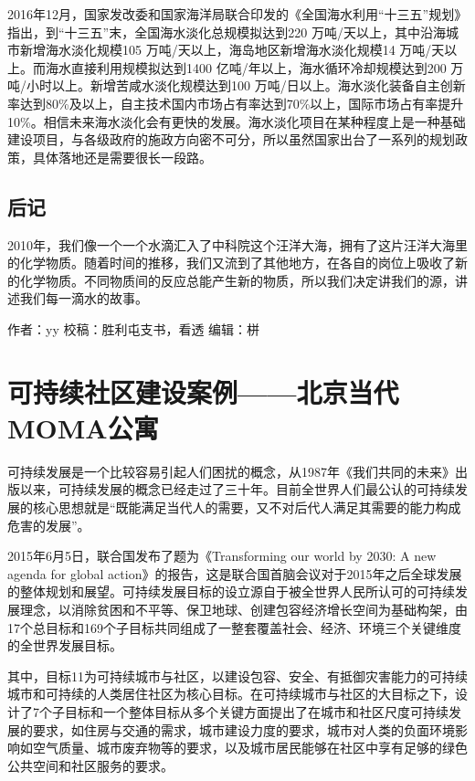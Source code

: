 \documentclass[]{book}
\begin{document}
2016年12月，国家发改委和国家海洋局联合印发的《全国海水利用``十三五''规划》指出，到``十三五''末，全国海水淡化总规模拟达到220
万吨/天以上，其中沿海城市新增海水淡化规模105
万吨/天以上，海岛地区新增海水淡化规模14
万吨/天以上。而海水直接利用规模拟达到1400
亿吨/年以上，海水循环冷却规模达到200
万吨/小时以上。新增苦咸水淡化规模达到100
万吨/日以上。海水淡化装备自主创新率达到80\%及以上，自主技术国内市场占有率达到70\%以上，国际市场占有率提升10\%。相信未来海水淡化会有更快的发展。海水淡化项目在某种程度上是一种基础建设项目，与各级政府的施政方向密不可分，所以虽然国家出台了一系列的规划政策，具体落地还是需要很长一段路。

\subsection{后记}

2010年，我们像一个一个水滴汇入了中科院这个汪洋大海，拥有了这片汪洋大海里的化学物质。随着时间的推移，我们又流到了其他地方，在各自的岗位上吸收了新的化学物质。不同物质间的反应总能产生新的物质，所以我们决定讲我们的源，讲述我们每一滴水的故事。

作者：yy 校稿：胜利屯支书，看透 编辑：栟

\section{可持续社区建设案例------北京当代MOMA公寓}\label{moma}

可持续发展是一个比较容易引起人们困扰的概念，从1987年《我们共同的未来》出版以来，可持续发展的概念已经走过了三十年。目前全世界人们最公认的可持续发展的核心思想就是``既能满足当代人的需要，又不对后代人满足其需要的能力构成危害的发展''。

2015年6月5日，联合国发布了题为《Transforming our world by 2030: A new
agenda for global
action》的报告，这是联合国首脑会议对于2015年之后全球发展的整体规划和展望。可持续发展目标的设立源自于被全世界人民所认可的可持续发展理念，以消除贫困和不平等、保卫地球、创建包容经济增长空间为基础构架，由17个总目标和169个子目标共同组成了一整套覆盖社会、经济、环境三个关键维度的全世界发展目标。

其中，目标11为可持续城市与社区，以建设包容、安全、有抵御灾害能力的可持续城市和可持续的人类居住社区为核心目标。在可持续城市与社区的大目标之下，设计了7个子目标和一个整体目标从多个关键方面提出了在城市和社区尺度可持续发展的要求，如住房与交通的需求，城市建设力度的要求，城市对人类的负面环境影响如空气质量、城市废弃物等的要求，以及城市居民能够在社区中享有足够的绿色公共空间和社区服务的要求。
\end{document}

